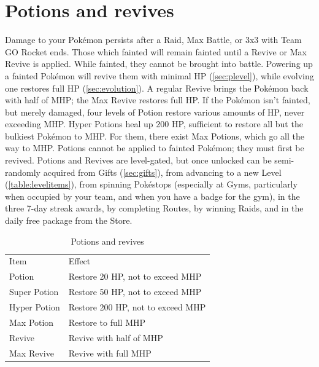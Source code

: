 \section{Potions and revives}
Damage to your Pokémon persists after a Raid, Max Battle, or 3x3 with Team GO Rocket ends.
Those which fainted will remain fainted until a Revive or Max Revive is applied.
While fainted, they cannot be brought into battle.
Powering up a fainted Pokémon will revive them with minimal HP (\autoref{sec:plevel}),
  while evolving one restores full HP (\autoref{sec:evolution}).
A regular Revive brings the Pokémon back with half of MHP; the Max Revive restores full HP.
If the Pokémon isn't fainted, but merely damaged, four levels of Potion
  restore various amounts of HP, never exceeding MHP\@.
Hyper Potions heal up 200 HP, sufficient to restore all but the bulkiest Pokémon to MHP.
For them, there exist Max Potions, which go all the way to MHP.
Potions cannot be applied to fainted Pokémon; they must first be revived.
Potions and Revives are level-gated, but once unlocked can be semi-randomly acquired
  from Gifts (\autoref{sec:gifts}),
  from advancing to a new Level (\autoref{table:levelitems}),
  from spinning Pokéstops (especially at Gyms, particularly when occupied by your team, and when you have a badge for the gym),
  in the three 7-day streak awards,
  by completing Routes,
  by winning Raids,
  and in the daily free package from the Store.
\begin{table}
\begin{center}
\begin{tabular}{ll}
Item & Effect \\
\Midrule
Potion & Restore 20 HP, not to exceed MHP\\
Super Potion & Restore 50 HP, not to exceed MHP\\
Hyper Potion & Restore 200 HP, not to exceed MHP\\
Max Potion & Restore to full MHP\\
Revive & Revive with half of MHP\\
Max Revive & Revive with full MHP\\
\end{tabular}
\end{center}
\caption{Potions and revives\label{table:potions}}
\end{table}

